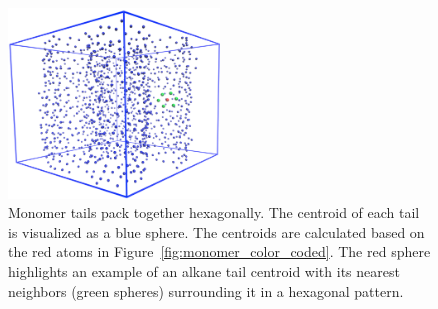 \documentclass[journal=jpcbfk,manusciprt=article]{achemso}
\begin{document}
  \begin{figure}[!htb]
        \centering
                \includegraphics[width=0.5\textwidth]{centroids_box.png}
		\caption{Monomer tails pack together hexagonally. The centroid
			of each tail is visualized as a blue sphere. The centroids are calculated based
			on the red atoms in Figure~\ref{fig:monomer_color_coded}. The red sphere
			highlights an example of an alkane tail centroid with its nearest neighbors
			(green spheres) surrounding it in a hexagonal pattern.}\label{fig:centroids}
  \end{figure}
\end{document}
